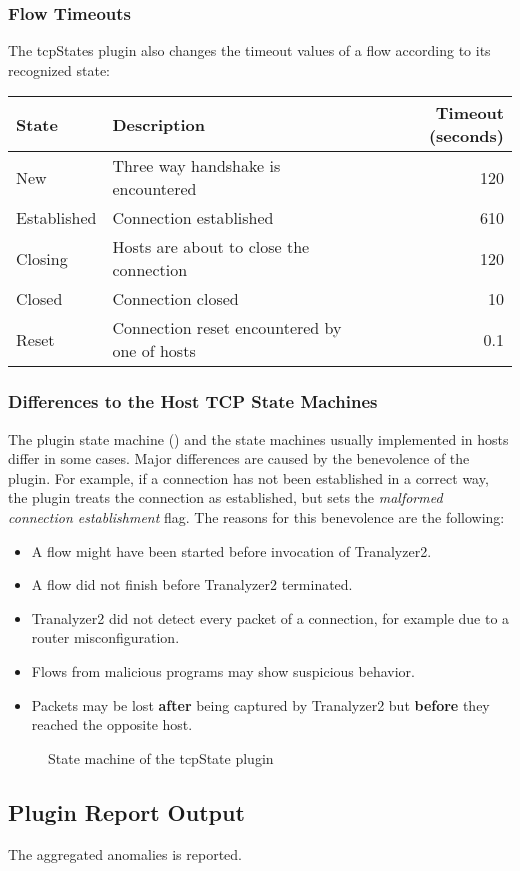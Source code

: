 \documentclass[documentation]{subfiles}
\begin{document}
\subsubsection{Flow Timeouts}
The tcpStates plugin also changes the timeout values of a flow according to its recognized state:
\begin{longtable}{llr}
    \toprule
    {\bf State} & {\bf Description} & {\bf Timeout (seconds)} \\
    \midrule\endhead%
    New & Three way handshake is encountered & 120 \\
    Established & Connection established & 610 \\
    Closing & Hosts are about to close the connection & 120 \\
    Closed & Connection closed & 10 \\
    Reset & Connection reset encountered by one of hosts & 0.1 \\
    \bottomrule
\end{longtable}

\subsubsection{Differences to the Host TCP State Machines}
The plugin state machine () and the state machines usually implemented in hosts differ in some cases. Major differences are caused by the benevolence of the plugin. For example, if a connection has not been established in a correct way, the plugin treats the connection as established, but sets the {\em malformed connection establishment} flag. The reasons for this benevolence are the following:
\begin{itemize}
    \item A flow might have been started before invocation of Tranalyzer2.
    \item A flow did not finish before Tranalyzer2 terminated.
    \item Tranalyzer2 did not detect every packet of a connection, for example due to a router misconfiguration.
    \item Flows from malicious programs may show suspicious behavior.
    \item Packets may be lost {\bf after} being captured by Tranalyzer2 but {\bf before} they reached the opposite host.
\end{itemize}

\begin{figure}[!ht]
    \centering
    \caption{State machine of the tcpState plugin}
    \label{fig:tcpstates}
\end{figure}

\subsection{Plugin Report Output}
The aggregated  anomalies is reported.
\end{document}

